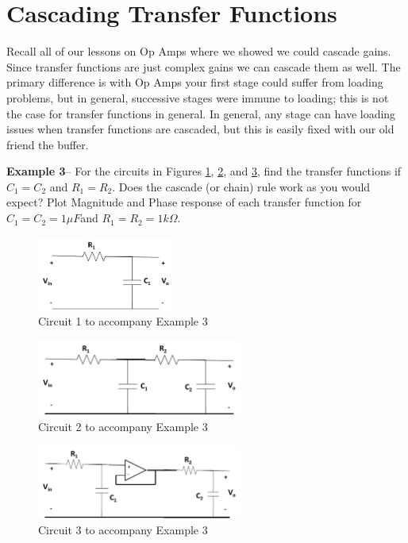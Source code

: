 \documentclass{handout}
\begin{document}
\newpage
\clearpage
\pagebreak

\section{Cascading Transfer Functions}
Recall all of our lessons on Op Amps where we showed we could cascade gains.  Since transfer functions are just complex gains we can cascade them as well.  The primary difference is with Op Amps your first stage could suffer from loading problems, but in general, successive stages were immune to loading; this is not the case for transfer functions in general.  In general, any stage can have loading issues when transfer functions are cascaded, but this is easily fixed with our old friend the buffer.

\textbf{Example 3}-- For the circuits in Figures \ref{fig: Example3a}, \ref{fig: Example3b}, and \ref{fig: Example3c}, find the transfer functions if $C_1=C_2$ and $R_1=R_2$.  Does the cascade (or chain) rule work as you would expect? Plot Magnitude and Phase response of each transfer function for $C_1=C_2=1\mu F$and $R_1=R_2=1k\Omega$.

\begin{figure} [h!]
\centering
\includegraphics[width=0.4\textwidth]{Example3a.jpg}
\caption{Circuit 1 to accompany Example 3}
\label{fig: Example3a}
\end{figure}
\begin{figure} [h!]
\centering
\includegraphics[width=0.6\textwidth]{Example3b.jpg}
\caption{Circuit 2 to accompany Example 3}
\label{fig: Example3b}
\end{figure}
\begin{figure} [h!]
\centering
\includegraphics[width=0.6\textwidth]{Example3c.jpg}
\caption{Circuit 3 to accompany Example 3}
\label{fig: Example3c}
\end{figure}
\end{document}
